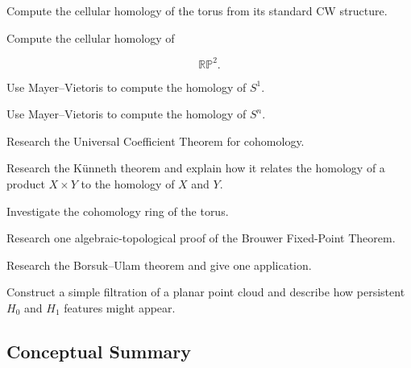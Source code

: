 \begin{exercise}[4]
Compute the cellular homology of the torus from its standard CW structure.
\end{exercise}

\begin{exercise}[4]
Compute the cellular homology of

\[
\mathbb{RP}^2.
\]
\end{exercise}

\begin{exercise}[4]
Use Mayer--Vietoris to compute the homology of \(S^1\).
\end{exercise}

\begin{exercise}[4]
Use Mayer--Vietoris to compute the homology of \(S^n\).
\end{exercise}

\begin{exercise}[4]
Research the Universal Coefficient Theorem for cohomology.
\end{exercise}

\begin{exercise}[4]
Research the K\"unneth theorem and explain how it relates the homology of a
product \(X\times Y\) to the homology of \(X\) and \(Y\).
\end{exercise}

\begin{exercise}[4]
Investigate the cohomology ring of the torus.
\end{exercise}

\begin{exercise}[4]
Research one algebraic-topological proof of the Brouwer Fixed-Point Theorem.
\end{exercise}

\begin{exercise}[4]
Research the Borsuk--Ulam theorem and give one application.
\end{exercise}

\begin{exercise}[4]
Construct a simple filtration of a planar point cloud and describe how
persistent \(H_0\) and \(H_1\) features might appear.
\end{exercise}

\subsection{Conceptual Summary}
\label{subsec:algebraic-topology-summary}

